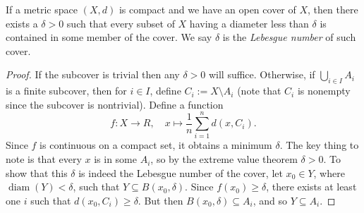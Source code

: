 \begin{lemma}
    If a metric space $(X,d)$ is compact and we have an open cover of $X$, then there exists a $\delta>0$ such that every subset of $X$ having a diameter less than $\delta$ is contained in some member of the cover. We say $\delta$ is the \emph{Lebesgue number} of such cover.
\end{lemma}
\begin{proof}
    If the subcover is trivial then any $\delta>0$ will suffice. Otherwise, if $\bigcup_{i \in  I} A_i$ is a finite subcover, then for $i\in I$, define $C_i :=X\setminus A_i$ (note that $C_i$ is nonempty since the subcover is nontrivial). Define a function \[
        f \colon X \to R,\quad x \mapsto \frac{1}{n} \sum_{i=1}^{n} d(x,C_i).
    \] Since $f$ is continuous on a compact set, it obtains a minimum $\delta$. The key thing to note is that every $x$ is in some $A_i$, so by the extreme value theorem $\delta >0$. To show that this $\delta$ is indeed the Lebesgue number of the cover, let $x_0\in Y$, where $\operatorname{diam}(Y)<\delta$, such that $Y\subseteq B(x_0,\delta)$. Since $f(x_0)\geq \delta$, there exists at least one $i$ such that $d(x_0,C_i)\geq \delta$. But then $B(x_0,\delta)\subseteq A_i$, and so $Y\subseteq A_i$.
\end{proof}


